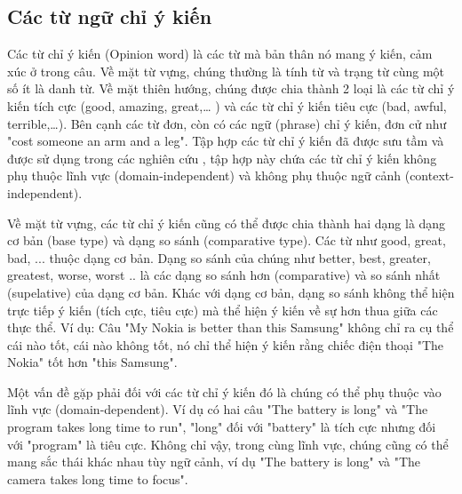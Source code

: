 \documentclass[12pt]{report}
\begin{document}
			\subsection*{Các từ ngữ chỉ ý kiến}
				\label{ow_section}	
				\par Các từ chỉ ý kiến (Opinion word) là các từ mà bản thân nó mang ý kiến, cảm xúc ở trong câu. Về mặt từ vựng, chúng thường là tính từ và trạng từ cùng một số ít là danh từ. Về mặt thiên hướng, chúng được chia thành 2 loại là các từ chỉ ý kiến tích cực (good, amazing, great,… ) và các từ chỉ ý kiến tiêu cực (bad, awful, terrible,…). Bên cạnh các từ đơn, còn có các ngữ (phrase) chỉ ý kiến, đơn cử như "cost someone an arm and a leg". Tập hợp các từ chỉ ý kiến đã được sưu tầm và được sử dụng trong các nghiên cứu \cite{sentiment}, tập hợp này chứa các từ chỉ ý kiến không phụ thuộc lĩnh vực (domain-independent) và không phụ thuộc ngữ cảnh (context-independent).	
				\par Về mặt từ vựng, các từ chỉ ý kiến cũng có thể được chia thành hai dạng là dạng cơ bản (base type) và dạng so sánh (comparative type). Các từ như good, great, bad, ... thuộc dạng cơ bản. Dạng so sánh của chúng như better, best, greater, greatest, worse, worst .. là các dạng so sánh hơn (comparative) và so sánh nhất (supelative) của dạng cơ bản. Khác với dạng cơ bản, dạng so sánh không thể hiện trực tiếp ý kiến (tích cực, tiêu cực) mà thể hiện ý kiến về sự hơn thua giữa các thực thể. Ví dụ: Câu "My Nokia is better than this Samsung" không chỉ ra cụ thể cái nào tốt, cái nào không tốt, nó chỉ thể hiện ý kiến rằng chiếc điện thoại "The Nokia" tốt hơn "this Samsung".
				\par Một vấn đề gặp phải đối với các từ chỉ ý kiến đó là chúng có thể phụ thuộc vào lĩnh vực (domain-dependent). Ví dụ có hai câu "The battery is long" và "The program takes long time to run", "long" đối với "battery" là tích cực nhưng đối với "program" là tiêu cực. Không chỉ vậy, trong cùng lĩnh vực, chúng cũng có thể mang sắc thái khác nhau tùy ngữ cảnh, ví dụ "The battery is long" và "The camera takes long time to focus".	
\end{document}
